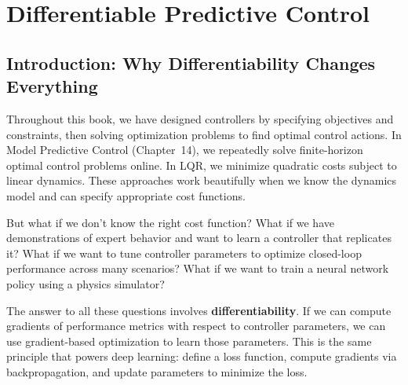 \chapter{Differentiable Predictive Control}
\label{ch:differentiable_control}


\section{Introduction: Why Differentiability Changes Everything}
\label{sec:diff_intro}

Throughout this book, we have designed controllers by specifying objectives and constraints, then solving optimization problems to find optimal control actions. In Model Predictive Control (Chapter~14), we repeatedly solve finite-horizon optimal control problems online. In LQR, we minimize quadratic costs subject to linear dynamics. These approaches work beautifully when we know the dynamics model and can specify appropriate cost functions.

But what if we don't know the right cost function? What if we have demonstrations of expert behavior and want to learn a controller that replicates it? What if we want to tune controller parameters to optimize closed-loop performance across many scenarios? What if we want to train a neural network policy using a physics simulator?

The answer to all these questions involves \textbf{differentiability}. If we can compute gradients of performance metrics with respect to controller parameters, we can use gradient-based optimization to learn those parameters. This is the same principle that powers deep learning: define a loss function, compute gradients via backpropagation, and update parameters to minimize the loss.

